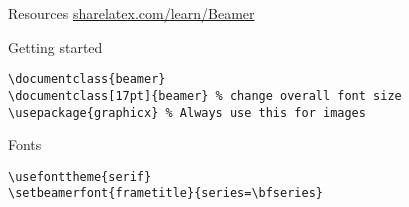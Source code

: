 \documentclass[9pt]{beamer}
\begin{document}
\begin{frame}{Resources}
    \url{sharelatex.com/learn/Beamer}
\end{frame}
\begin{frame}[fragile=singleslide]{Getting started}
\begin{verbatim}
\documentclass{beamer}
\documentclass[17pt]{beamer} % change overall font size
\usepackage{graphicx} % Always use this for images
\end{verbatim}
\end{frame}

\begin{frame}[fragile=singleslide]{Fonts}
    \begin{verbatim}
\usefonttheme{serif}
\setbeamerfont{frametitle}{series=\bfseries}
    \end{verbatim}





\end{frame}
\end{document}
